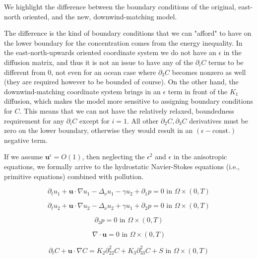 \documentclass[11pt]{article}
\begin{document}
We highlight the difference between the boundary conditions of the original, east-north oriented, and the new, downwind-matching model.

The difference is the kind of boundary conditions that we can "afford" to have on the lower boundary for the concentration comes from the energy inequality. In the east-north-upwards oriented coordinate system we do not have an $\epsilon$ in the diffusion matrix, and thus it is not an issue to have any of the $\partial_i C$ terms to be different from 0, not even for an ocean case where $\partial_3 C$ becomes nonzero as well (they are required however to be bounded of course). On the other hand, the downwind-matching coordinate system brings in an $\epsilon$ term in front of the $K_1$ diffusion, which makes the model more sensitive to assigning boundary conditions for $C.$ This means that we can not have the relatively relaxed, boundedness requirement for any $\partial_i C$ except for $i=1.$ All other $\partial_2 C, \partial_3 C$ derivatives must be zero on the lower boundary, otherwise they would result in an $(\epsilon - \text{const.})$ negative term.

If we assume $\mathbf{u}^\epsilon = O(1)$, then neglecting the $\epsilon^2$ and $\epsilon$ in the anisotropic equations, we formally arrive to the hydrostatic Navier-Stokes equations (i.e., primitive equations) combined with pollution.

    \begin{equation} \label{HNSC1}    
    \partial_t u_1 + \mathbf{u} \cdot \nabla u_1 - \Delta_\nu u_1 -\gamma u_2 + \partial_1 p = 0 \text{ in } \Omega \times (0,T)
    \end{equation}
    
    \begin{equation} \label{HNSC2}   
    \partial_t u_2 + \mathbf{u} \cdot \nabla u_2 - \Delta_\nu u_2 + \gamma u_1 + \partial_2 p = 0 \text{ in } \Omega \times (0,T)
    \end{equation}
    
    \begin{equation} \label{HNSC3}   
    \partial_3 p = 0 \text{ in } \Omega \times (0,T)
    \end{equation}
    
    \begin{equation} \label{HNSC4}   
    \nabla \cdot \mathbf{u} = 0 \text{ in } \Omega \times (0,T)
    \end{equation}
    
    \begin{equation} \label{HNSC5}   
    \partial_t C + \mathbf{u} \cdot \nabla C = K_2 \partial_{22} ^ 2 C + K_3 \partial_{33} ^2 C + S \text{ in } \Omega \times (0,T)
    \end{equation}
    
\end{document}
